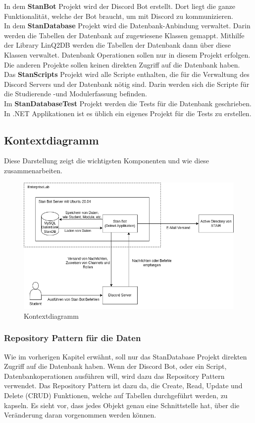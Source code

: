 \documentclass[a4paper, table]{article}
\begin{document}
In dem \textbf{StanBot} Projekt wird der Discord Bot erstellt. 
Dort liegt die ganze Funktionalität, welche der Bot braucht, um mit Discord zu kommunizieren. \\
In dem \textbf{StanDatabase} Projekt wird die Datenbank-Anbindung verwaltet. 
Darin werden die Tabellen der Datenbank auf zugewiesene Klassen gemappt. 
Mithilfe der Library LinQ2DB werden die Tabellen der Datenbank dann über diese Klassen verwaltet. 
Datenbank Operationen sollen nur in diesem Projekt erfolgen. 
Die anderen Projekte sollen keinen direkten Zugriff auf die Datenbank haben.\\
Das \textbf{StanScripts} Projekt wird alle Scripte enthalten, die für die Verwaltung des Discord Servers und der Datenbank nötig sind. 
Darin werden sich die Scripte für die Studierende -und Modulerfassung befinden.\\
Im \textbf{StanDatabaseTest} Projekt werden die Tests für die Datenbank geschrieben.
In .NET Applikationen ist es üblich ein eigenes Projekt für die Tests zu erstellen.\autocite{tdykstra_organisieren_nodate}

\newpage
\subsection{Kontextdiagramm}

Diese Darstellung zeigt die wichtigsten Komponenten und wie diese zusammenarbeiten.

\begin{figure}[h]
    \centering
    \includegraphics[width=1\textwidth]{img/wipro-stanBotContextDiagram.png}
    \caption{Kontextdiagramm}
    \label{fig:Kontextdiagramm}
\end{figure}

\newpage
\subsubsection{Repository Pattern für die Daten}
Wie im vorherigen Kapitel erwähnt, soll nur das StanDatabase Projekt direkten Zugriff auf die Datenbank haben. 
Wenn der Discord Bot, oder ein Script, Datenbankoperationen ausführen will, wird dazu das Repository Pattern verwendet.
Das Repository Pattern ist dazu da, die Create, Read, Update und Delete (CRUD) Funktionen, welche auf Tabellen durchgeführt werden, zu kapseln. \autocite{gosebrink_aspnet_2014}
Es sieht vor, dass jedes Objekt genau eine Schnittstelle hat, über die Veränderung daran vorgenommen werden können.
\end{document}
